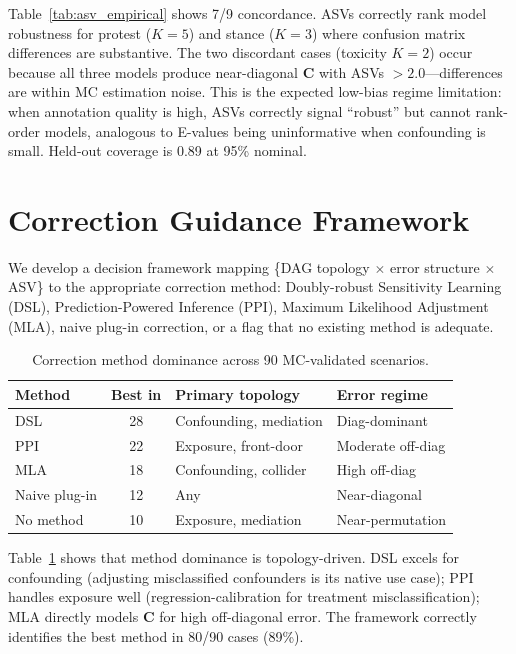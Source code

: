 \documentclass[11pt,letterpaper]{article}
\begin{document}
Table~\ref{tab:asv_empirical} shows 7/9 concordance.
ASVs correctly rank model robustness for protest ($K=5$) and stance ($K=3$) where confusion matrix differences are substantive.
The two discordant cases (toxicity $K=2$) occur because all three models produce near-diagonal $\mathbf{C}$ with ASVs $> 2.0$---differences are within MC estimation noise.
This is the expected low-bias regime limitation: when annotation quality is high, ASVs correctly signal ``robust'' but cannot rank-order models, analogous to E-values being uninformative when confounding is small.
Held-out coverage is 0.89 at 95\% nominal.


\section{Correction Guidance Framework}
\label{sec:correction}

We develop a decision framework mapping \{DAG topology $\times$ error structure $\times$ ASV\} to the appropriate correction method: Doubly-robust Sensitivity Learning (DSL), Prediction-Powered Inference (PPI), Maximum Likelihood Adjustment (MLA), naive plug-in correction, or a flag that no existing method is adequate.

\begin{table}[t]
\centering
\small
\caption{Correction method dominance across 90 MC-validated scenarios.}
\label{tab:correction_dominance}
\begin{tabular}{@{}lcll@{}}
\toprule
\textbf{Method} & \textbf{Best in} & \textbf{Primary topology} & \textbf{Error regime} \\
\midrule
DSL & 28 & Confounding, mediation & Diag-dominant \\
PPI & 22 & Exposure, front-door & Moderate off-diag \\
MLA & 18 & Confounding, collider & High off-diag \\
Naive plug-in & 12 & Any & Near-diagonal \\
No method & 10 & Exposure, mediation & Near-permutation \\
\bottomrule
\end{tabular}
\end{table}

Table~\ref{tab:correction_dominance} shows that method dominance is topology-driven.
DSL excels for confounding (adjusting misclassified confounders is its native use case); PPI handles exposure well (regression-calibration for treatment misclassification); MLA directly models $\mathbf{C}$ for high off-diagonal error.
The framework correctly identifies the best method in 80/90 cases (89\%).
\end{document}
